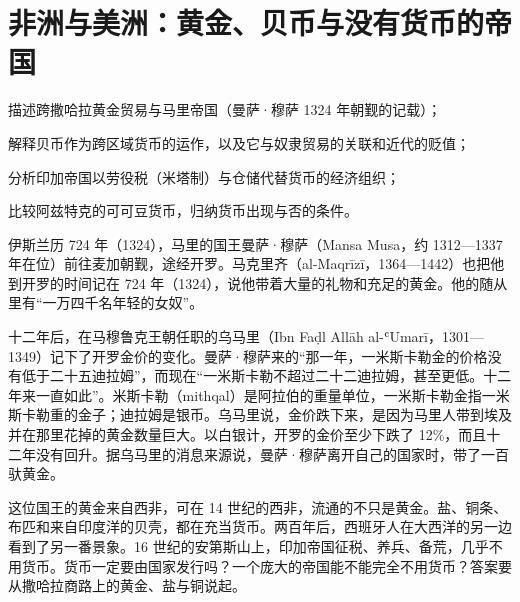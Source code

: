 \chapter{非洲与美洲：黄金、贝币与没有货币的帝国}\label{ch:africa}

\begin{chapterguide}
\begin{guidegoals}
\item 描述跨撒哈拉黄金贸易与马里帝国（曼萨·穆萨 1324 年朝觐的记载）；
\item 解释贝币作为跨区域货币的运作，以及它与奴隶贸易的关联和近代的贬值；
\item 分析印加帝国以劳役税（米塔制）与仓储代替货币的经济组织；
\item 比较阿兹特克的可可豆货币，归纳货币出现与否的条件。
\end{guidegoals}
\end{chapterguide}

伊斯兰历 724 年（1324），马里的国王曼萨·穆萨（Mansa Musa，约 1312—1337 年在位）前往麦加朝觐，途经开罗。马克里齐（al-Maqrīzī，1364—1442）也把他到开罗的时间记在 724 年（1324），说他带着大量的礼物和充足的黄金\cite{umari1927}。他的随从里有“一万四千名年轻的女奴”\cite{umari1927}。

十二年后，在马穆鲁克王朝任职的乌马里（Ibn Faḍl Allāh al-ʿUmarī，1301—1349）记下了开罗金价的变化。曼萨·穆萨来的“那一年，一米斯卡勒金的价格没有低于二十五迪拉姆”，而现在“一米斯卡勒不超过二十二迪拉姆，甚至更低。十二年来一直如此”。米斯卡勒（mithqal）是阿拉伯的重量单位，一米斯卡勒金指一米斯卡勒重的金子；迪拉姆是银币。乌马里说，金价跌下来，是因为马里人带到埃及并在那里花掉的黄金数量巨大\cite{umari1927}。以白银计，开罗的金价至少下跌了 12\%，而且十二年没有回升。据乌马里的消息来源说，曼萨·穆萨离开自己的国家时，带了一百驮黄金\cite{umari1927}。

这位国王的黄金来自西非，可在 14 世纪的西非，流通的不只是黄金。盐、铜条、布匹和来自印度洋的贝壳，都在充当货币。两百年后，西班牙人在大西洋的另一边看到了另一番景象。16 世纪的安第斯山上，印加帝国征税、养兵、备荒，几乎不用货币。货币一定要由国家发行吗？一个庞大的帝国能不能完全不用货币？答案要从撒哈拉商路上的黄金、盐与铜说起。

